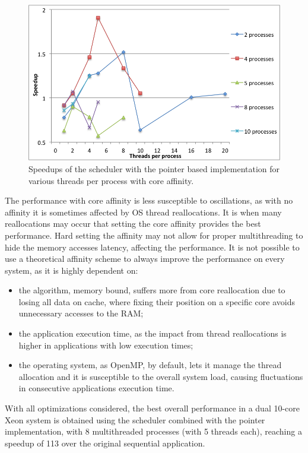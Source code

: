 \begin{figure}[!htp]
	\begin{center}
		\includegraphics[scale=0.55]{charts/speedup_sched_aff_1024.png}
		\caption{Speedups of the scheduler with the pointer based implementation for various threads per process with core affinity.}
		\label{fig:sched_aff}
	\end{center}
\end{figure}

The performance with core affinity is less susceptible to oscillations, as with no affinity it is sometimes affected by OS thread reallocations. It is when many reallocations may occur that setting the core affinity provides the best performance. Hard setting the affinity may not allow for proper multithreading to hide the memory accesses latency, affecting the performance. It is not possible to use a theoretical affinity scheme to always improve the performance on every system, as it is highly dependent on:

\begin{itemize}
	\item the algorithm, memory bound, suffers more from core reallocation due to losing all data on cache, where fixing their position on a specific core avoids unnecessary accesses to the RAM;
	\item the application execution time, as the impact from thread reallocations is higher in applications with low execution times;
	\item the operating system, as OpenMP, by default, lets it manage the thread allocation and it is susceptible to the overall system load, causing fluctuations in consecutive applications execution time.
\end{itemize}

With all optimizations considered, the best overall performance in a dual 10-core Xeon system is obtained using the scheduler combined with the pointer implementation, with 8 multithreaded processes (with 5 threads each), reaching a speedup of 113 over the original sequential application.
